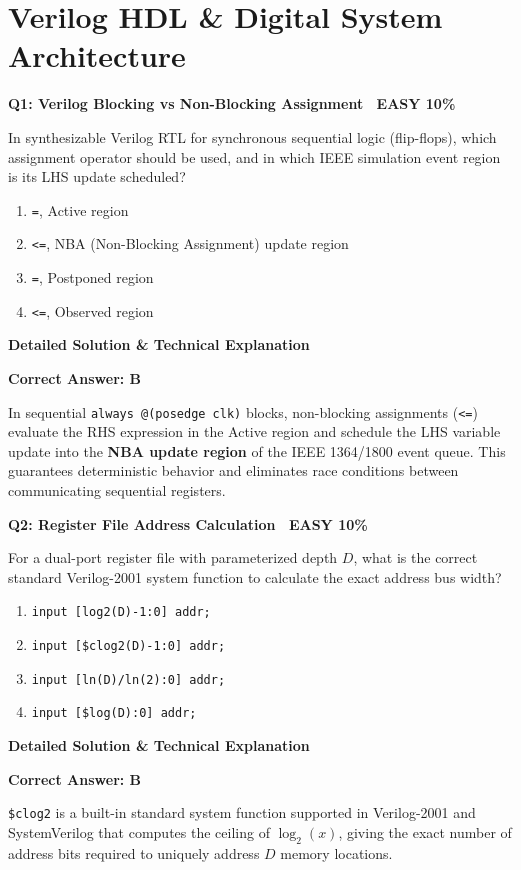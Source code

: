 \documentclass[11pt,a4paper]{article}
\newcommand{\badgeeasy}{{\color{white}\colorbox{easygreen}{\bfseries\sffamily\tiny\ EASY 10\%\ }}}
\newenvironment{qbox}[2]{%
  \begin{mdframed}[style=qstyle]%
  {\bfseries\sffamily\color{primaryblue}#1 \hfill #2}\par\vspace{2pt}%
}{%
  \end{mdframed}%
}
\newenvironment{ansbox}{%
  \begin{mdframed}[style=ansstyle]%
  {\bfseries\sffamily\color{ansgreen}\small Detailed Solution \& Technical Explanation}\par\vspace{2pt}\small%
}{%
  \end{mdframed}%
}
\begin{document}
\newpage
\tableofcontents
\newpage

\section{Verilog HDL \& Digital System Architecture}

\begin{qbox}{Q1: Verilog Blocking vs Non-Blocking Assignment}{\badgeeasy}
In synthesizable Verilog RTL for synchronous sequential logic (flip-flops), which assignment operator should be used, and in which IEEE simulation event region is its LHS update scheduled?
\begin{enumerate}[label=\textbf{\Alph*.}]
  \item \texttt{=}, Active region
  \item \texttt{<=}, NBA (Non-Blocking Assignment) update region
  \item \texttt{=}, Postponed region
  \item \texttt{<=}, Observed region
\end{enumerate}
\end{qbox}
\begin{ansbox}
\textbf{Correct Answer: B}

In sequential \texttt{always @(posedge clk)} blocks, non-blocking assignments (\texttt{<=}) evaluate the RHS expression in the Active region and schedule the LHS variable update into the \textbf{NBA update region} of the IEEE 1364/1800 event queue. This guarantees deterministic behavior and eliminates race conditions between communicating sequential registers.
\end{ansbox}

\begin{qbox}{Q2: Register File Address Calculation}{\badgeeasy}
For a dual-port register file with parameterized depth $D$, what is the correct standard Verilog-2001 system function to calculate the exact address bus width?
\begin{enumerate}[label=\textbf{\Alph*.}]
  \item \texttt{input [log2(D)-1:0] addr;}
  \item \texttt{input [\$clog2(D)-1:0] addr;}
  \item \texttt{input [ln(D)/ln(2):0] addr;}
  \item \texttt{input [\$log(D):0] addr;}
\end{enumerate}
\end{qbox}
\begin{ansbox}
\textbf{Correct Answer: B}

\texttt{\$clog2} is a built-in standard system function supported in Verilog-2001 and SystemVerilog that computes the ceiling of $\log_2(x)$, giving the exact number of address bits required to uniquely address $D$ memory locations.
\end{ansbox}
\end{document}
